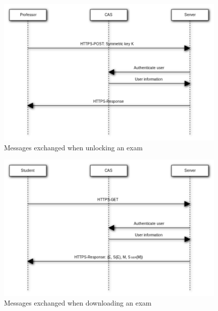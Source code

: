 \documentclass{article}
\begin{document}
\begin{figure}
\begin{center}
\includegraphics[width=\textwidth]{images/unlock_exam.pdf}
\caption{Messages exchanged when unlocking an exam}
\label{fig:log-in}
\end{center}
\end{figure}

\begin{figure}
\begin{center}
\includegraphics[width=\textwidth]{images/download_exam.pdf}
\caption{Messages exchanged when downloading an exam}
\label{fig:log-in}
\end{center}
\end{figure}
\end{document}
